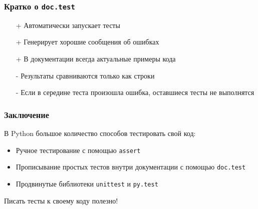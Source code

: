 \documentclass[fleqn, xcolor=x11names]{beamer}
\begin{document}
\begin{frame}[fragile]\frametitle{Кратко о \texttt{doc.test}}

\begin{itemize}
\item[+] Автоматически запускает тесты

\item[+] Генерирует хорошие сообщения об ошибках

\item[+] В документации всегда актуальные примеры кода

\item[-] Результаты сравниваются только как строки

\item[-] Если в середине теста произошла ошибка, оставшиеся тесты не выполнятся
\end{itemize}
\end{frame}



\begin{frame}[fragile]\frametitle{Заключение}

В Python большое количество способов тестировать свой код:  
\begin{itemize}
\item Ручное тестирование с помощью \texttt{assert}

\item Прописывание простых тестов внутри документации с помощью \texttt{doc.test}

\item Продвинутые библиотеки \texttt{unittest} и \texttt{py.test}

\end{itemize}

\hfill

Писать тесты к своему коду полезно! 

\hfill


\end{frame}
\end{document}
